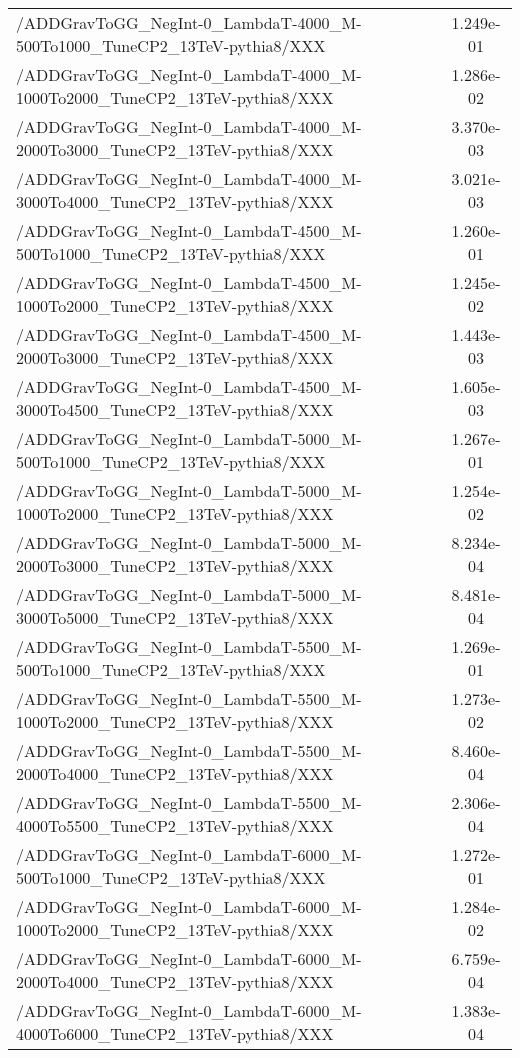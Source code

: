 \begin{landscape}
\begin{table}[!htbp]
\begin{tabular}{lc}
/ADDGravToGG\_NegInt-0\_LambdaT-4000\_M-500To1000\_TuneCP2\_13TeV-pythia8/XXX &  1.249e-01\\
/ADDGravToGG\_NegInt-0\_LambdaT-4000\_M-1000To2000\_TuneCP2\_13TeV-pythia8/XXX &  1.286e-02\\
/ADDGravToGG\_NegInt-0\_LambdaT-4000\_M-2000To3000\_TuneCP2\_13TeV-pythia8/XXX &  3.370e-03\\
/ADDGravToGG\_NegInt-0\_LambdaT-4000\_M-3000To4000\_TuneCP2\_13TeV-pythia8/XXX &  3.021e-03\\
/ADDGravToGG\_NegInt-0\_LambdaT-4500\_M-500To1000\_TuneCP2\_13TeV-pythia8/XXX &  1.260e-01\\
/ADDGravToGG\_NegInt-0\_LambdaT-4500\_M-1000To2000\_TuneCP2\_13TeV-pythia8/XXX &  1.245e-02\\
/ADDGravToGG\_NegInt-0\_LambdaT-4500\_M-2000To3000\_TuneCP2\_13TeV-pythia8/XXX &  1.443e-03\\
/ADDGravToGG\_NegInt-0\_LambdaT-4500\_M-3000To4500\_TuneCP2\_13TeV-pythia8/XXX &  1.605e-03\\
/ADDGravToGG\_NegInt-0\_LambdaT-5000\_M-500To1000\_TuneCP2\_13TeV-pythia8/XXX &  1.267e-01\\
/ADDGravToGG\_NegInt-0\_LambdaT-5000\_M-1000To2000\_TuneCP2\_13TeV-pythia8/XXX &  1.254e-02\\
/ADDGravToGG\_NegInt-0\_LambdaT-5000\_M-2000To3000\_TuneCP2\_13TeV-pythia8/XXX &  8.234e-04\\
/ADDGravToGG\_NegInt-0\_LambdaT-5000\_M-3000To5000\_TuneCP2\_13TeV-pythia8/XXX &  8.481e-04\\
/ADDGravToGG\_NegInt-0\_LambdaT-5500\_M-500To1000\_TuneCP2\_13TeV-pythia8/XXX &  1.269e-01\\
/ADDGravToGG\_NegInt-0\_LambdaT-5500\_M-1000To2000\_TuneCP2\_13TeV-pythia8/XXX &  1.273e-02\\
/ADDGravToGG\_NegInt-0\_LambdaT-5500\_M-2000To4000\_TuneCP2\_13TeV-pythia8/XXX &  8.460e-04\\
/ADDGravToGG\_NegInt-0\_LambdaT-5500\_M-4000To5500\_TuneCP2\_13TeV-pythia8/XXX &  2.306e-04\\
/ADDGravToGG\_NegInt-0\_LambdaT-6000\_M-500To1000\_TuneCP2\_13TeV-pythia8/XXX &  1.272e-01\\
/ADDGravToGG\_NegInt-0\_LambdaT-6000\_M-1000To2000\_TuneCP2\_13TeV-pythia8/XXX &  1.284e-02\\
/ADDGravToGG\_NegInt-0\_LambdaT-6000\_M-2000To4000\_TuneCP2\_13TeV-pythia8/XXX &  6.759e-04\\
/ADDGravToGG\_NegInt-0\_LambdaT-6000\_M-4000To6000\_TuneCP2\_13TeV-pythia8/XXX &  1.383e-04\\

\end{tabular}
\end{table}
\end{landscape}
